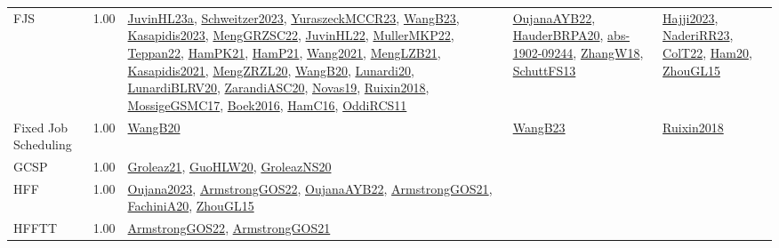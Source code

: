 {\begin{longtable}{p{3cm}r>{\raggedright\arraybackslash}p{6cm}>{\raggedright\arraybackslash}p{6cm}>{\raggedright\arraybackslash}p{8cm}}
\index{FJS}\index{Classification!FJS}FJS &  1.00 & \hyperref[detail:JuvinHL23a]{JuvinHL23a}, \hyperref[detail:Schweitzer2023]{Schweitzer2023}, \hyperref[detail:YuraszeckMCCR23]{YuraszeckMCCR23}, \hyperref[detail:WangB23]{WangB23}, \hyperref[detail:Kasapidis2023]{Kasapidis2023}, \hyperref[detail:MengGRZSC22]{MengGRZSC22}, \hyperref[detail:JuvinHL22]{JuvinHL22}, \hyperref[detail:MullerMKP22]{MullerMKP22}, \hyperref[detail:Teppan22]{Teppan22}, \hyperref[detail:HamPK21]{HamPK21}, \hyperref[detail:HamP21]{HamP21}, \hyperref[detail:Wang2021]{Wang2021}, \hyperref[detail:MengLZB21]{MengLZB21}, \hyperref[detail:Kasapidis2021]{Kasapidis2021}, \hyperref[detail:MengZRZL20]{MengZRZL20}, \hyperref[detail:WangB20]{WangB20}, \hyperref[detail:Lunardi20]{Lunardi20}, \hyperref[detail:LunardiBLRV20]{LunardiBLRV20}, \hyperref[detail:ZarandiASC20]{ZarandiASC20}, \hyperref[detail:Novas19]{Novas19}, \hyperref[detail:Ruixin2018]{Ruixin2018}, \hyperref[detail:MossigeGSMC17]{MossigeGSMC17}, \hyperref[detail:Boek2016]{Boek2016}, \hyperref[detail:HamC16]{HamC16}, \hyperref[detail:OddiRCS11]{OddiRCS11} & \hyperref[detail:OujanaAYB22]{OujanaAYB22}, \hyperref[detail:HauderBRPA20]{HauderBRPA20}, \hyperref[detail:abs-1902-09244]{abs-1902-09244}, \hyperref[detail:ZhangW18]{ZhangW18}, \hyperref[detail:SchuttFS13]{SchuttFS13} & \hyperref[detail:Hajji2023]{Hajji2023}, \hyperref[detail:NaderiRR23]{NaderiRR23}, \hyperref[detail:ColT22]{ColT22}, \hyperref[detail:Ham20]{Ham20}, \hyperref[detail:ZhouGL15]{ZhouGL15}\\
\index{Fixed Job Scheduling}\index{Classification!Fixed Job Scheduling}Fixed Job Scheduling &  1.00 & \hyperref[detail:WangB20]{WangB20} & \hyperref[detail:WangB23]{WangB23} & \hyperref[detail:Ruixin2018]{Ruixin2018}\\
\index{GCSP}\index{Classification!GCSP}GCSP &  1.00 & \hyperref[detail:Groleaz21]{Groleaz21}, \hyperref[detail:GuoHLW20]{GuoHLW20}, \hyperref[detail:GroleazNS20]{GroleazNS20} &  & \\
\index{HFF}\index{Classification!HFF}HFF &  1.00 & \hyperref[detail:Oujana2023]{Oujana2023}, \hyperref[detail:ArmstrongGOS22]{ArmstrongGOS22}, \hyperref[detail:OujanaAYB22]{OujanaAYB22}, \hyperref[detail:ArmstrongGOS21]{ArmstrongGOS21}, \hyperref[detail:FachiniA20]{FachiniA20}, \hyperref[detail:ZhouGL15]{ZhouGL15} &  & \\
\index{HFFTT}\index{Classification!HFFTT}HFFTT &  1.00 & \hyperref[detail:ArmstrongGOS22]{ArmstrongGOS22}, \hyperref[detail:ArmstrongGOS21]{ArmstrongGOS21} &  & \\

\end{longtable}}

